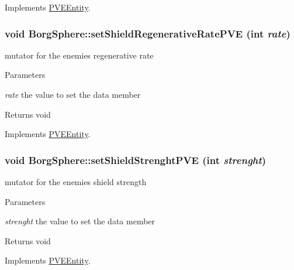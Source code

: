 Implements \hyperlink{classPVEEntity}{PVEEntity}.

\hypertarget{classBorgSphere_aab1b504e0fd34caae8e74cbe5bddc4dc}{
\subsubsection[{setShieldRegenerativeRatePVE}]{\setlength{\rightskip}{0pt plus 5cm}void BorgSphere::setShieldRegenerativeRatePVE (int {\em rate})}}
\label{d6/ddd/classBorgSphere_aab1b504e0fd34caae8e74cbe5bddc4dc}
mutator for the enemies regenerative rate


\begin{DoxyParams}{Parameters}
\item[{\em rate}]the value to set the data member\end{DoxyParams}
\begin{DoxyReturn}{Returns}
void 
\end{DoxyReturn}


Implements \hyperlink{classPVEEntity}{PVEEntity}.

\hypertarget{classBorgSphere_a579ab6dc3cb1118ed07a6deb42aa6efa}{
\subsubsection[{setShieldStrenghtPVE}]{\setlength{\rightskip}{0pt plus 5cm}void BorgSphere::setShieldStrenghtPVE (int {\em strenght})}}
\label{d6/ddd/classBorgSphere_a579ab6dc3cb1118ed07a6deb42aa6efa}
mutator for the enemies shield strength


\begin{DoxyParams}{Parameters}
\item[{\em strenght}]the value to set the data member\end{DoxyParams}
\begin{DoxyReturn}{Returns}
void 
\end{DoxyReturn}


Implements \hyperlink{classPVEEntity}{PVEEntity}.

